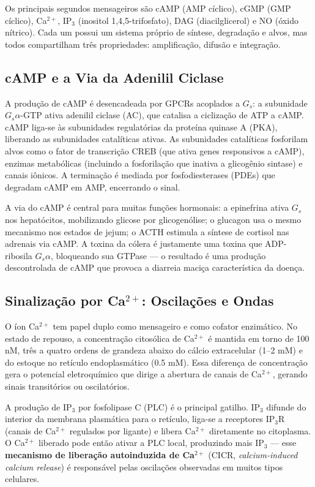 Os principais segundos mensageiros são cAMP (AMP cíclico), cGMP (GMP cíclico),
Ca$^{2+}$, IP$_3$ (inositol 1,4,5-trifosfato), DAG (diacilglicerol) e NO (óxido
nítrico). Cada um possui um sistema próprio de síntese, degradação e alvos,
mas todos compartilham três propriedades: amplificação, difusão e integração.

\subsection{cAMP e a Via da Adenilil Ciclase}
\label{subfigure:09-camp}

A produção de cAMP é desencadeada por GPCRs acoplados a $G_s$: a subunidade
$G_s\alpha$-GTP ativa adenilil ciclase (AC), que catalisa a ciclização de ATP
a cAMP. cAMP liga-se às subunidades regulatórias da proteína quinase A (PKA),
liberando as subunidades catalíticas ativas. As subunidades catalíticas
fosforilam alvos como o fator de transcrição CREB (que ativa genes
responsivos a cAMP), enzimas metabólicas (incluindo a fosforilação que
inativa a glicogênio sintase) e canais iônicos. A terminação é mediada por
fosfodiesterases (PDEs) que degradam cAMP em AMP, encerrando o sinal.

A via do cAMP é central para muitas funções hormonais: a epinefrina ativa
$G_s$ nos hepatócitos, mobilizando glicose por glicogenólise; o glucagon usa o
mesmo mecanismo nos estados de jejum; o ACTH estimula a síntese de cortisol
nas adrenais via cAMP. A toxina da cólera é justamente uma toxina que
ADP-ribosila $G_s\alpha$, bloqueando sua GTPase --- o resultado é uma
produção descontrolada de cAMP que provoca a diarreia maciça característica
da doença.

\subsection{Sinalização por Ca$^{2+}$: Oscilações e Ondas}
\label{subfigure:09-calcio}

O íon Ca$^{2+}$ tem papel duplo como mensageiro e como cofator enzimático. No
estado de repouso, a concentração citosólica de Ca$^{2+}$ é mantida em torno de
100 nM, três a quatro ordens de grandeza abaixo do cálcio extracelular (1--2 mM)
e do estoque no retículo endoplasmático (0.5 mM). Essa diferença de
concentração gera o potencial eletroquímico que dirige a abertura de canais
de Ca$^{2+}$, gerando sinais transitórios ou oscilatórios.

A produção de IP$_3$ por fosfolipase C (PLC) é o principal gatilho. IP$_3$
difunde do interior da membrana plasmática para o retículo, liga-se a
receptores IP$_3$R (canais de Ca$^{2+}$ regulados por ligante) e libera Ca$^{2+}$
diretamente no citoplasma. O Ca$^{2+}$ liberado pode então ativar a PLC
local, produzindo mais IP$_3$ --- esse \textbf{mecanismo de liberação
autoinduzida de Ca$^{2+}$} (CICR, \emph{calcium-induced calcium release}) é
responsável pelas oscilações observadas em muitos tipos celulares.

